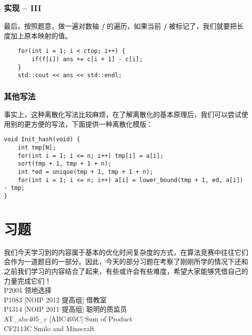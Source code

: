 \documentclass{beamer}
\begin{document}
\begin{frame}[fragile]
\frametitle{实现 -- III}
最后，按照题意，做一遍对数轴 $f$ 的遍历，如果当前 $f$ 被标记了，我们就要把长度加上原本映射的值。
\begin{onlyenv}
\begin{verbatim}
    for(int i = 1; i < ctop; i++) {
        if(f[i]) ans += c[i + 1] - c[i];
    }
    std::cout << ans << std::endl;
\end{verbatim}
\end{onlyenv}
\end{frame}
\begin{frame}[fragile]
\frametitle{其他写法}
事实上，这种离散化写法比较麻烦，在了解离散化的基本原理后，我们可以尝试使用别的更方便的写法，下面提供一种离散化模版：
\begin{onlyenv}
\begin{verbatim}
void Init_hash(void) {
    int tmp[N];
    for(int i = 1; i <= n; i++) tmp[i] = a[i];
    sort(tmp + 1, tmp + 1 + n);
    int *ed = unique(tmp + 1, tmp + 1 + n);
    for(int i = 1; i <= n; i++) a[i] = lower_bound(tmp + 1, ed, a[i]) - tmp;
}
\end{verbatim}
\end{onlyenv}
\end{frame}
\section{习题}
\begin{frame}
我们今天学习到的内容属于基本的优化时间复杂度的方式，在算法竞赛中往往它们会作为一道题目的一部分。因此，今天的部分习题在考察了刚刚所学的情况下还和之前我们学习的内容结合了起来，有些或许会有些难度，希望大家能够凭借自己的力量完成它们！ \\
P2004	领地选择\\
P1083	[NOIP 2012 提高组] 借教室\\
P1314	[NOIP 2011 提高组] 聪明的质监员\\
AT\_abc405\_c [ABC405C] Sum of Product\\
CF2113C Smilo and Minecraft
\end{frame}
\end{document}
